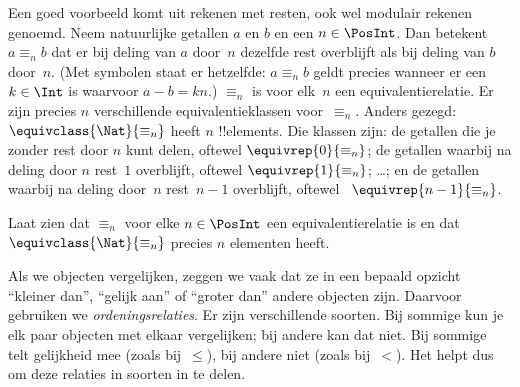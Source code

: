 \documentclass[openany]{memoir}
\begin{document}
\begin{ex}
Een goed voorbeeld komt uit rekenen met resten, ook wel modulair rekenen
genoemd. Neem natuurlijke getallen $a$ en $b$ en een $n \in \PosInt$.
Dan betekent $a \equiv_n b$ dat
er bij deling van $a$ door~$n$ dezelfde rest overblijft als bij deling
van $b$ door~$n$. (Met symbolen staat er hetzelfde: $a \equiv_n b$ geldt
precies wanneer er een $k \in \Int$ is waarvoor $a - b = kn$.)
$\equiv_n$ is voor elk~$n$ een equivalentierelatie. Er zijn precies $n$
verschillende equivalentieklassen voor~$\equiv_n$. Anders gezegd:
$\equivclass{\Nat}{\equiv_n}$ heeft $n$ !!{element}s. Die klassen zijn:
de getallen die je zonder rest door $n$ kunt delen, oftewel
$\equivrep{0}{\equiv_n}$; de getallen waarbij na deling door $n$ rest~$1$
overblijft, oftewel $\equivrep{1}{\equiv_n}$; \ldots; en de getallen
waarbij na deling door~$n$ rest~$n-1$ overblijft, oftewel
~$\equivrep{n-1}{\equiv_n}$.
\end{ex}

\begin{prob}
Laat zien dat $\equiv_n$ voor elke $n \in \PosInt$ een
equivalentierelatie is en dat $\equivclass{\Nat}{\equiv_n}$ precies
$n$ elementen heeft.
\end{prob}
\endgroup

\begingroup
\def\olfilename{OLP-0016}
\def\olfilepath{content/sets-functions-relations/relations/}
\hypertarget{unit-OLP-0016}{}




\begin{explain}
Als we objecten vergelijken, zeggen we vaak dat ze in een bepaald opzicht
``kleiner dan'', ``gelijk aan'' of ``groter dan'' andere objecten zijn. Daarvoor
gebruiken we \emph{ordeningsrelaties}. Er zijn verschillende soorten. Bij
sommige kun je elk paar objecten met elkaar vergelijken; bij andere kan dat
niet. Bij sommige telt gelijkheid mee (zoals bij~$\le$), bij andere niet (zoals
bij~$<$). Het helpt dus om deze relaties in soorten in te delen.
\end{explain}
\end{document}
